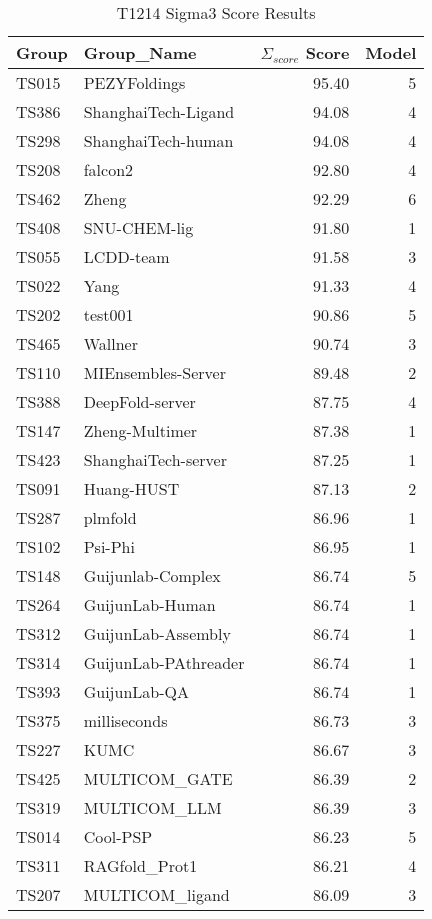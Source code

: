 \begin{table*}[ht]
\caption{T1214 Sigma3 Score Results}
\label{tab:T1214_Sigma_score_split}
\scriptsize
\begin{minipage}[t]{0.48\textwidth}
\centering
\begin{tabular}{llrr}
\toprule
Group & Group\_Name & $\Sigma_{score}$ Score & Model \\ 
\midrule
TS015 & PEZYFoldings & 95.40 & 5 \\ 
TS386 & ShanghaiTech-Ligand & 94.08 & 4 \\ 
TS298 & ShanghaiTech-human & 94.08 & 4 \\ 
TS208 & falcon2 & 92.80 & 4 \\ 
TS462 & Zheng & 92.29 & 6 \\ 
TS408 & SNU-CHEM-lig & 91.80 & 1 \\ 
TS055 & LCDD-team & 91.58 & 3 \\ 
TS022 & Yang & 91.33 & 4 \\ 
TS202 & test001 & 90.86 & 5 \\ 
TS465 & Wallner & 90.74 & 3 \\ 
TS110 & MIEnsembles-Server & 89.48 & 2 \\ 
TS388 & DeepFold-server & 87.75 & 4 \\ 
TS147 & Zheng-Multimer & 87.38 & 1 \\ 
TS423 & ShanghaiTech-server & 87.25 & 1 \\ 
TS091 & Huang-HUST & 87.13 & 2 \\ 
TS287 & plmfold & 86.96 & 1 \\ 
TS102 & Psi-Phi & 86.95 & 1 \\ 
TS148 & Guijunlab-Complex & 86.74 & 5 \\ 
TS264 & GuijunLab-Human & 86.74 & 1 \\ 
TS312 & GuijunLab-Assembly & 86.74 & 1 \\ 
TS314 & GuijunLab-PAthreader & 86.74 & 1 \\ 
TS393 & GuijunLab-QA & 86.74 & 1 \\ 
TS375 & milliseconds & 86.73 & 3 \\ 
TS227 & KUMC & 86.67 & 3 \\ 
TS425 & MULTICOM\_GATE & 86.39 & 2 \\ 
TS319 & MULTICOM\_LLM & 86.39 & 3 \\ 
TS014 & Cool-PSP & 86.23 & 5 \\ 
TS311 & RAGfold\_Prot1 & 86.21 & 4 \\ 
TS207 & MULTICOM\_ligand & 86.09 & 3 \\ 

\end{tabular}
\end{minipage}
\end{table*}
